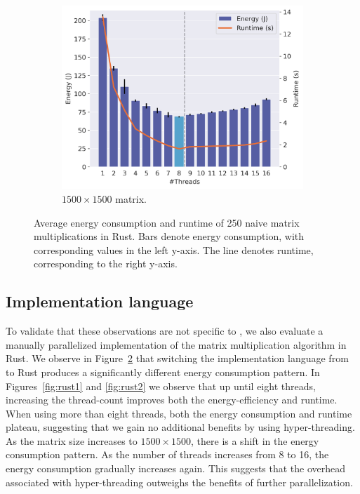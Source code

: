 \begin{figure}[!ht]
\begin{subfigure}{0.33\linewidth}
        \includegraphics[width=\linewidth]{images/rust_1500.png}
        \caption{$1500 \times 1500$ matrix.}
        \label{fig:rust3}
    \end{subfigure}%
    \caption{Average energy consumption and runtime of 250 naive matrix multiplications in Rust.
    Bars denote energy consumption, with corresponding values in the left y-axis.
    The line denotes runtime, corresponding to the right y-axis.}
    \label{fig:rust}
\end{figure}

\subsection{Implementation language}

To validate that these observations are not specific to \sac{}, we also evaluate a manually parallelized implementation of the matrix multiplication algorithm in Rust.
We observe in Figure~\ref{fig:rust} that switching the implementation language from \sac{} to Rust produces a significantly different energy consumption pattern.
In Figures~\ref{fig:rust1} and \ref{fig:rust2} we observe that up until eight threads, increasing the thread-count improves both the energy-efficiency and runtime.
When using more than eight threads, both the energy consumption and runtime plateau, suggesting that we gain no additional benefits by using hyper-threading.
As the matrix size increases to $1500 \times 1500$, there is a shift in the energy consumption pattern.
As the number of threads increases from 8 to 16, the energy consumption gradually increases again.
This suggests that the overhead associated with hyper-threading outweighs the benefits of further parallelization.

